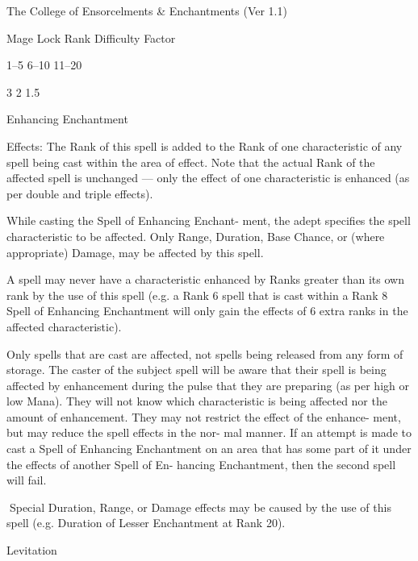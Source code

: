 \begin{Chapter}{The College of Ensorcelments \& Enchantments (Ver 1.1)}
\begin{spell}[S-6]{Mage Lock }
Rank  Difficulty Factor 

1–5 
6–10 
11–20 

3 
2 
1.5 

\end{spell}

\begin{spell}[S-7]{Enhancing Enchantment }

Effects: The Rank of this spell is added to the Rank 
of one characteristic of any spell being cast within 
the area of effect. Note that the actual Rank of the 
affected  spell  is  unchanged  —  only  the  effect  of 
one  characteristic  is  enhanced  (as  per  double  and 
triple effects). 

While  casting  the  Spell  of  Enhancing  Enchant-
ment, the adept specifies the spell characteristic to 
be  affected.  Only  Range,  Duration,  Base  Chance, 
or  (where  appropriate)  Damage,  may  be  affected 
by this spell. 

A  spell  may  never  have  a  characteristic  enhanced 
by  Ranks  greater  than  its  own  rank  by  the  use  of 
this  spell  (e.g.  a  Rank  6  spell  that  is  cast  within  a 
Rank 8 Spell of Enhancing Enchantment will only 
gain  the  effects  of  6  extra  ranks  in  the  affected 
characteristic). 

Only  spells  that  are  cast  are  affected,  not  spells 
being  released  from  any  form  of  storage.  The 
caster  of  the  subject  spell  will  be  aware  that  their 
spell  is  being  affected  by  enhancement  during  the 
pulse  that  they  are  preparing  (as  per  high  or  low 
Mana). They  will not know which characteristic is 
being  affected  nor  the  amount  of  enhancement. 
They  may  not  restrict  the  effect  of  the  enhance-
ment,  but  may  reduce  the  spell  effects  in  the  nor-
mal manner. If an attempt is made to cast a Spell of 
Enhancing  Enchantment  on  an  area  that  has  some 
part  of  it  under  the  effects  of  another  Spell  of  En-
hancing  Enchantment,  then  the  second  spell  will 
fail. 

Special  Duration,  Range,  or  Damage  effects  may 
be caused by the use of this spell (e.g. Duration of 
Lesser Enchantment at Rank 20). 

\end{spell}

\begin{spell}[S-8]{Levitation }


\end{spell}
\end{Chapter}
